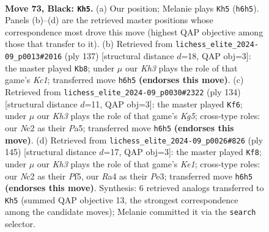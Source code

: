 \documentclass[11pt]{article}
\begin{document}
\clearpage

\begin{figure}[p]\centering
\begin{subfigure}{0.46\textwidth}\centering
\resizebox{\linewidth}{!}{%
\newchessgame
\chessboard[
  setfen={8/6R1/5B1k/8/r7/7K/2n1bP2/8 b - - 7 73},
  showmover=false,
  pgfstyle=straightmove, color=movearrow, markmove={h6-h5}
]}
\caption{}
\end{subfigure}\hfill
\begin{subfigure}{0.46\textwidth}\centering
\resizebox{\linewidth}{!}{%
\newchessgame
\chessboard[
  setfen={2k5/2R5/1B6/3K4/8/8/6r1/8 b - - 25 69},
  showmover=false,
  pgfstyle=straightmove, color=movearrow, markmove={c8-b8}
]}
\caption{}
\end{subfigure}
\\[4pt]
\begin{subfigure}{0.46\textwidth}\centering
\resizebox{\linewidth}{!}{%
\newchessgame
\chessboard[
  setfen={6k1/R7/2pB4/P5K1/6r1/8/4b3/8 w - - 0 68},
  showmover=false,
  pgfstyle=straightmove, color=movearrow, markmove={g5-f6}
]}
\caption{}
\end{subfigure}\hfill
\begin{subfigure}{0.46\textwidth}\centering
\resizebox{\linewidth}{!}{%
\newchessgame
\chessboard[
  setfen={4k3/8/5K2/5p2/5P2/4p3/4B1P1/3R4 b - - 3 73},
  showmover=false,
  pgfstyle=straightmove, color=movearrow, markmove={e8-f8}
]}
\caption{}
\end{subfigure}
\caption{\textbf{Move 73, Black: \texttt{Kh5}.} (a) Our position; Melanie plays \texttt{Kh5} (\texttt{h6h5}). Panels (b)--(d) are the retrieved master positions whose correspondence most drove this move (highest QAP objective among those that transfer to it). (b) Retrieved from \texttt{lichess\_elite\_2024-09\_p0013\#2016} (ply 137) [structural distance $d$=18, QAP obj=3]: the master played \texttt{Kb8}; under $\mu$ our \emph{Kh3} plays the role of that game's \emph{Kc1}; transferred move \texttt{h6h5} \textbf{(endorses this move)}. (c) Retrieved from \texttt{lichess\_elite\_2024-09\_p0030\#2322} (ply 134) [structural distance $d$=11, QAP obj=3]: the master played \texttt{Kf6}; under $\mu$ our \emph{Kh3} plays the role of that game's \emph{Kg5}; cross-type roles: our \emph{N}c2 as their \emph{P}a5; transferred move \texttt{h6h5} \textbf{(endorses this move)}. (d) Retrieved from \texttt{lichess\_elite\_2024-09\_p0026\#826} (ply 145) [structural distance $d$=17, QAP obj=3]: the master played \texttt{Kf8}; under $\mu$ our \emph{Kh3} plays the role of that game's \emph{Ke1}; cross-type roles: our \emph{N}c2 as their \emph{P}f5, our \emph{R}a4 as their \emph{P}e3; transferred move \texttt{h6h5} \textbf{(endorses this move)}. Synthesis: 6 retrieved analogs transferred to \texttt{Kh5} (summed QAP objective 13, the strongest correspondence among the candidate moves); Melanie committed it via the \texttt{search} selector.}
\label{fig:thought-m145}
\end{figure}
\end{document}
